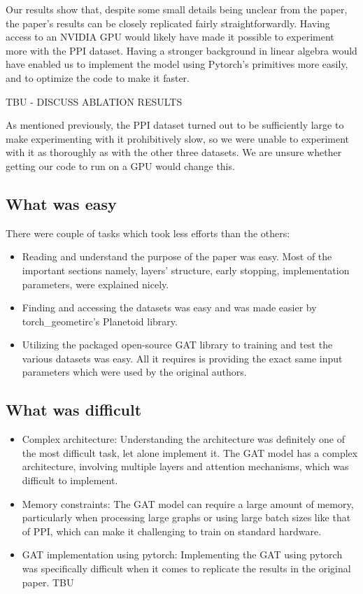 Our results show that, despite some small details being unclear from the
paper, the paper's results can be closely replicated fairly
straightforwardly. Having access to an NVIDIA GPU would likely have made
it possible to experiment more with the PPI dataset. Having a stronger
background in linear algebra would have enabled us to implement the model
using Pytorch's primitives more easily, and to optimize the code to make it
faster.

TBU - DISCUSS ABLATION RESULTS

As mentioned previously, the PPI dataset turned out to be sufficiently
large to make experimenting with it prohibitively slow, so we were unable
to experiment with it as thoroughly as with the other three datasets. We
are unsure whether getting our code to run on a GPU would change this.

\subsection{What was easy}\label{subsec:what-was-easy}
There were couple of tasks which took less efforts than the others:
\begin{itemize}
    \item Reading and understand the purpose of the paper was easy. Most of the important sections
    namely, layers' structure, early stopping, implementation parameters, were explained nicely.
    \item Finding and accessing the datasets was easy and was made easier by torch\_geometirc's Planetoid library.
    \item Utilizing the packaged open-source GAT library to training and test the various datasets was easy.
    All it requires is providing the exact same input parameters which were used by the original authors.
\end{itemize}


\subsection{What was difficult}\label{subsec:what-was-difficult}
\begin{itemize}
    \item Complex architecture: Understanding the architecture was definitely one of the most difficult task, let alone implement it.
    The GAT model has a complex architecture, involving multiple layers and attention mechanisms, which was difficult to
    implement.
    \item Memory constraints: The GAT model can require a large amount of memory,
    particularly when processing large graphs or using large batch sizes like that of PPI, which can make it challenging
    to train on standard hardware.
    \item GAT implementation using pytorch: Implementing the GAT using pytorch was specifically difficult when it
    comes to replicate the results in the original paper. TBU
\end{itemize}
